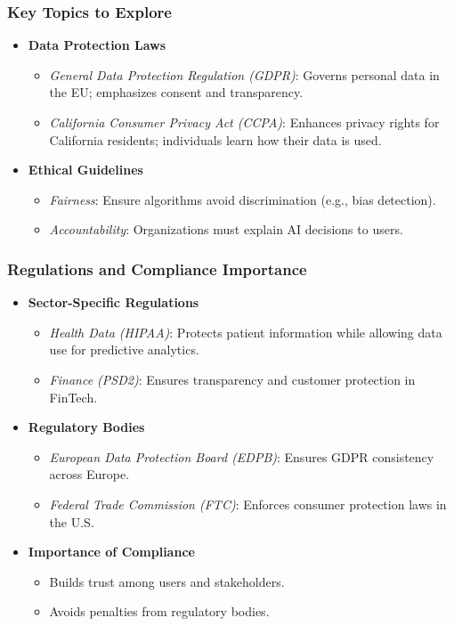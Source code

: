 \documentclass[aspectratio=169]{beamer}
\begin{document}
\begin{frame}[fragile]
    \frametitle{Key Topics to Explore}
    \begin{itemize}
        \item \textbf{Data Protection Laws}
            \begin{itemize}
                \item \textit{General Data Protection Regulation (GDPR)}: Governs personal data in the EU; emphasizes consent and transparency.
                \item \textit{California Consumer Privacy Act (CCPA)}: Enhances privacy rights for California residents; individuals learn how their data is used.
            \end{itemize}
        \item \textbf{Ethical Guidelines}
            \begin{itemize}
                \item \textit{Fairness}: Ensure algorithms avoid discrimination (e.g., bias detection).
                \item \textit{Accountability}: Organizations must explain AI decisions to users.
            \end{itemize}
    \end{itemize}
\end{frame}

\begin{frame}[fragile]
    \frametitle{Regulations and Compliance Importance}
    \begin{itemize}
        \item \textbf{Sector-Specific Regulations}
            \begin{itemize}
                \item \textit{Health Data (HIPAA)}: Protects patient information while allowing data use for predictive analytics.
                \item \textit{Finance (PSD2)}: Ensures transparency and customer protection in FinTech.
            \end{itemize}
        \item \textbf{Regulatory Bodies}
            \begin{itemize}
                \item \textit{European Data Protection Board (EDPB)}: Ensures GDPR consistency across Europe.
                \item \textit{Federal Trade Commission (FTC)}: Enforces consumer protection laws in the U.S.
            \end{itemize}
        \item \textbf{Importance of Compliance}
            \begin{itemize}
                \item Builds trust among users and stakeholders.
                \item Avoids penalties from regulatory bodies.
            \end{itemize}
    \end{itemize}
\end{frame}
\end{document}
